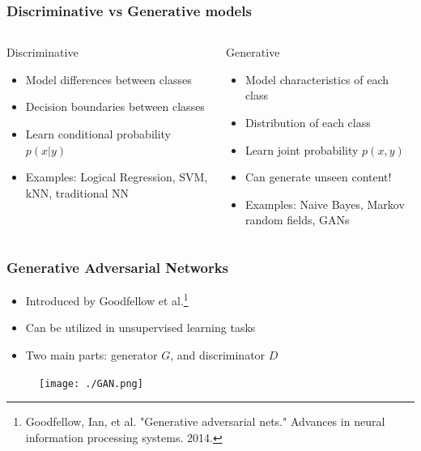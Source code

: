 \begin{frame}
\frametitle{Discriminative vs Generative models}
\begin{columns}
	\begin{block}{Discriminative}
		\begin{itemize}
			\item Model differences between classes
			\item Decision boundaries between classes
			\item Learn conditional probability $p(x|y)$
			\item Examples: Logical Regression, SVM, kNN, traditional NN
		\end{itemize}
	\end{block}
	\begin{block}{Generative}
		\begin{itemize}
			\item Model characteristics of each class
			\item Distribution of each class
			\item Learn joint probability $p(x,y)$
			\item Can generate unseen content!
			\item Examples: Naive Bayes, Markov random fields, GANs 
		\end{itemize}
	\end{block}
\end{columns}

\end{frame}

\begin{frame}
\frametitle{Generative Adversarial Networks}
\begin{itemize}
	\item Introduced by Goodfellow et al.\footnote{Goodfellow, Ian, et al. "Generative adversarial nets." Advances in neural information processing systems. 2014.}
	\item Can be utilized in unsupervised learning tasks
	\item Two main parts: generator $G$, and discriminator $D$
\end{itemize}
	\begin{figure}[!ht]
	\centering
	\texttt{[image: ./GAN.png]}
	\end{figure}
\end{frame}

